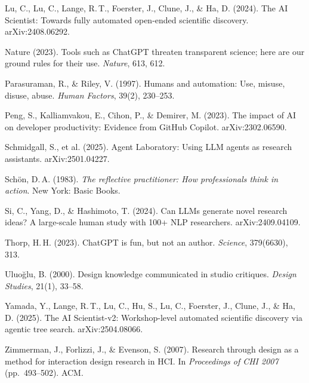 \documentclass[11pt]{article}
\begin{document}
\begin{list}{}{\setlength{\itemindent}{-2em}\setlength{\leftmargin}{2em}\setlength{\itemsep}{2pt}}
\item Lu, C., Lu, C., Lange, R.\,T., Foerster, J., Clune, J., \& Ha, D. (2024). The AI Scientist: Towards fully automated open-ended scientific discovery. arXiv:2408.06292.

\item Nature (2023). Tools such as ChatGPT threaten transparent science; here are our ground rules for their use. \emph{Nature}, 613, 612.

\item Parasuraman, R., \& Riley, V. (1997). Humans and automation: Use, misuse, disuse, abuse. \emph{Human Factors}, 39(2), 230--253.

\item Peng, S., Kalliamvakou, E., Cihon, P., \& Demirer, M. (2023). The impact of AI on developer productivity: Evidence from GitHub Copilot. arXiv:2302.06590.

\item Schmidgall, S., et al. (2025). Agent Laboratory: Using LLM agents as research assistants. arXiv:2501.04227.

\item Schön, D.\,A. (1983). \emph{The reflective practitioner: How professionals think in action}. New York: Basic Books.

\item Si, C., Yang, D., \& Hashimoto, T. (2024). Can LLMs generate novel research ideas? A large-scale human study with 100+ NLP researchers. arXiv:2409.04109.

\item Thorp, H.\,H. (2023). ChatGPT is fun, but not an author. \emph{Science}, 379(6630), 313.

\item Uluoğlu, B. (2000). Design knowledge communicated in studio critiques. \emph{Design Studies}, 21(1), 33--58.

\item Yamada, Y., Lange, R.\,T., Lu, C., Hu, S., Lu, C., Foerster, J., Clune, J., \& Ha, D. (2025). The AI Scientist-v2: Workshop-level automated scientific discovery via agentic tree search. arXiv:2504.08066.

\item Zimmerman, J., Forlizzi, J., \& Evenson, S. (2007). Research through design as a method for interaction design research in HCI. In \emph{Proceedings of CHI 2007} (pp.\ 493--502). ACM.

\end{list}
\end{document}
